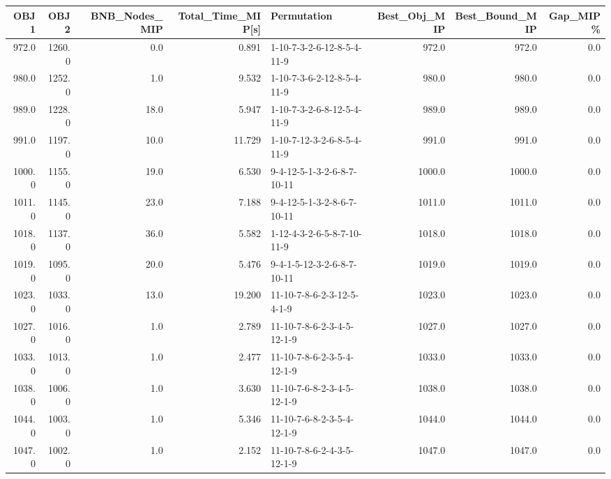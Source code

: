 \begin{tabular}{rrrrlrrr}
\toprule
   OBJ1 &    OBJ2 &  BNB\_Nodes\_MIP &  Total\_Time\_MIP[s] &                 Permutation &  Best\_Obj\_MIP &  Best\_Bound\_MIP &  Gap\_MIP\% \\
\midrule
  972.0 &  1260.0 &            0.0 &              0.891 &  1-10-7-3-2-6-12-8-5-4-11-9 &         972.0 &           972.0 &       0.0 \\
  980.0 &  1252.0 &            1.0 &              9.532 &  1-10-7-3-6-2-12-8-5-4-11-9 &         980.0 &           980.0 &       0.0 \\
  989.0 &  1228.0 &           18.0 &              5.947 &  1-10-7-3-2-6-8-12-5-4-11-9 &         989.0 &           989.0 &       0.0 \\
  991.0 &  1197.0 &           10.0 &             11.729 &  1-10-7-12-3-2-6-8-5-4-11-9 &         991.0 &           991.0 &       0.0 \\
 1000.0 &  1155.0 &           19.0 &              6.530 &  9-4-12-5-1-3-2-6-8-7-10-11 &        1000.0 &          1000.0 &       0.0 \\
 1011.0 &  1145.0 &           23.0 &              7.188 &  9-4-12-5-1-3-2-8-6-7-10-11 &        1011.0 &          1011.0 &       0.0 \\
 1018.0 &  1137.0 &           36.0 &              5.582 &  1-12-4-3-2-6-5-8-7-10-11-9 &        1018.0 &          1018.0 &       0.0 \\
 1019.0 &  1095.0 &           20.0 &              5.476 &  9-4-1-5-12-3-2-6-8-7-10-11 &        1019.0 &          1019.0 &       0.0 \\
 1023.0 &  1033.0 &           13.0 &             19.200 &  11-10-7-8-6-2-3-12-5-4-1-9 &        1023.0 &          1023.0 &       0.0 \\
 1027.0 &  1016.0 &            1.0 &              2.789 &  11-10-7-8-6-2-3-4-5-12-1-9 &        1027.0 &          1027.0 &       0.0 \\
 1033.0 &  1013.0 &            1.0 &              2.477 &  11-10-7-8-6-2-3-5-4-12-1-9 &        1033.0 &          1033.0 &       0.0 \\
 1038.0 &  1006.0 &            1.0 &              3.630 &  11-10-7-6-8-2-3-4-5-12-1-9 &        1038.0 &          1038.0 &       0.0 \\
 1044.0 &  1003.0 &            1.0 &              5.346 &  11-10-7-6-8-2-3-5-4-12-1-9 &        1044.0 &          1044.0 &       0.0 \\
 1047.0 &  1002.0 &            1.0 &              2.152 &  11-10-7-8-6-2-4-3-5-12-1-9 &        1047.0 &          1047.0 &       0.0 \\

\end{tabular}
